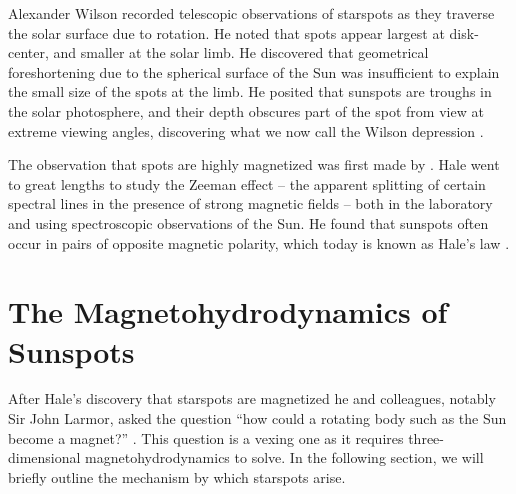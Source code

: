 Alexander Wilson recorded telescopic observations of starspots as they traverse the solar surface due to rotation. He noted that spots appear largest at disk-center, and smaller at the solar limb. He discovered that geometrical foreshortening due to the spherical surface of the Sun was insufficient to explain the small size of the spots at the limb. He posited that sunspots are troughs in the solar photosphere, and their depth obscures part of the spot from view at extreme viewing angles, discovering what we now call the Wilson depression \citep{Wilson1774}. 

The observation that spots are highly magnetized was first made by \citet{Hale1908}. Hale went to great lengths to study the Zeeman effect -- the apparent splitting of certain spectral lines in the presence of strong magnetic fields -- both in the laboratory and using spectroscopic observations of the Sun. He found that sunspots often occur in pairs of opposite magnetic polarity, which today is known as Hale's law \citep{Hale1925}.

\section{The Magnetohydrodynamics of Sunspots} \label{intro:mhd}

After Hale's discovery that starspots are magnetized he and colleagues, notably Sir John Larmor, asked the question ``how could a rotating body such as the Sun become a magnet?'' \citep{Larmor1919}. This question is a vexing one as it requires three-dimensional magnetohydrodynamics to solve. In the following section, we will briefly outline the mechanism by which starspots arise. 

